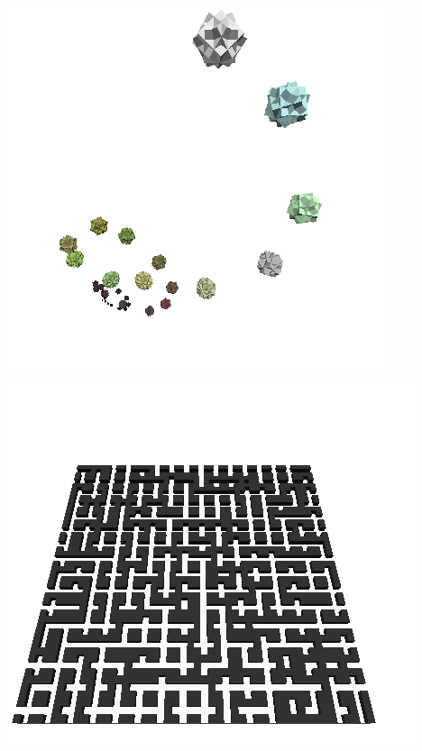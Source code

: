 \centerline{\includegraphics[scale=0.40]{../imagenes/eg24.png}}




\centerline{\includegraphics[scale=0.40]{../imagenes/eg25.png}}




